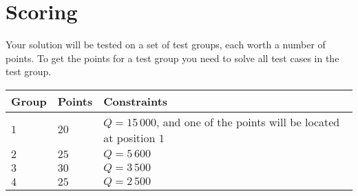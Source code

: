 \section*{Scoring}
Your solution will be tested on a set of test groups, each worth a number of points.
To get the points for a test group you need to solve all test cases in the test group.

\noindent
\begin{tabular}{| l | l | l |}
  \hline
  Group & Points & Constraints \\ \hline
  $1$   & $20$   & $Q = 15\,000$, and one of the points will be located at position $1$ \\ \hline
  $2$   & $25$   & $Q = 5\,600$ \\ \hline
  $3$   & $30$   & $Q = 3\,500$ \\ \hline
  $4$   & $25$   & $Q = 2\,500$ \\ \hline
\end{tabular}
